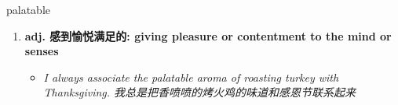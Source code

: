 
\begin{frame}
{\huge palatable}
\begin{center}
\begin{enumerate}\Large
  \item \textbf{adj. 感到愉悦满足的: giving pleasure or contentment to the mind or senses}
  \begin{itemize}
    \item \em{\Large{I always associate the palatable aroma of roasting turkey with Thanksgiving. 我总是把香喷喷的烤火鸡的味道和感恩节联系起来}}
  \end{itemize}
\end{enumerate}
\end{center}
\end{frame}
